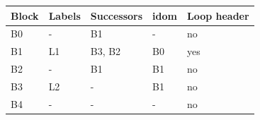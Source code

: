 \begin{tabular}{@{}lllll@{}}\toprule
\textbf{Block} & \textbf{Labels} & \textbf{Successors} & \textbf{idom} & \textbf{Loop header}\\ \midrule
B0 & - & B1 & - & no\\
B1 & L1 & B3, B2 & B0 & yes\\
B2 & - & B1 & B1 & no\\
B3 & L2 & - & B1 & no\\
B4 & - & - & - & no\\
\bottomrule
\end{tabular}
